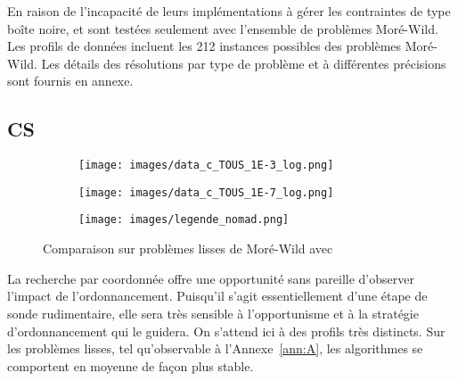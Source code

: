 En raison de l'incapacité de leurs implémentations à gérer les contraintes de type boîte noire, \GSS et \imfil sont testées seulement avec l'ensemble de problèmes Moré-Wild. Les profils de données incluent les 212 instances possibles des problèmes Moré-Wild. Les détails des résolutions par type de problème et à différentes précisions sont fournis en annexe.
\subsection{CS}\label{sec:ccs}
	\begin{figure}[!htb]\label{fig:cs_mw}
		\centering
		\begin{subfigure}{0.43\textwidth}
			\texttt{[image: images/data\_c\_TOUS\_1E-3\_log.png]}
			\label{fig:data_c_TOUS_1E-3_log}
		\end{subfigure}%
		\begin{subfigure}{0.43\textwidth}
			\texttt{[image: images/data\_c\_TOUS\_1E-7\_log.png]}
			\label{fig:data_c_TOUS_1E-7_log}
		\end{subfigure}
		\smallskip
		\begin{subfigure}{0.95\textwidth}
			\texttt{[image: images/legende\_nomad.png]}
		\end{subfigure}
		\caption{Comparaison sur problèmes lisses de Moré-Wild avec \CS}
	\end{figure}
La recherche par coordonnée offre une opportunité sans pareille d'observer l'impact de l'ordonnancement. Puisqu'il s'agit essentiellement d'une étape de sonde rudimentaire, elle sera très sensible à l'opportunisme et à la stratégie d'ordonnancement qui le guidera. On s'attend ici à des profils très distincts. Sur les problèmes lisses, tel qu'observable à l'Annexe~\ref{ann:A}, les algorithmes se comportent en moyenne de façon plus stable.

